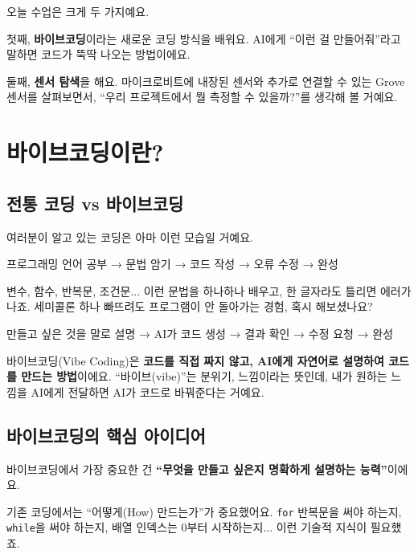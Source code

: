 \documentclass[11pt, a4paper]{article}
\begin{document}
오늘 수업은 크게 두 가지예요.

첫째, \textbf{바이브코딩}이라는 새로운 코딩 방식을 배워요. AI에게 ``이런 걸 만들어줘''라고 말하면 코드가 뚝딱 나오는 방법이에요.

둘째, \textbf{센서 탐색}을 해요. 마이크로비트에 내장된 센서와 추가로 연결할 수 있는 Grove 센서를 살펴보면서, ``우리 프로젝트에서 뭘 측정할 수 있을까?''를 생각해 볼 거예요.

\section{바이브코딩이란?}

\subsection{전통 코딩 vs 바이브코딩}

여러분이 알고 있는 코딩은 아마 이런 모습일 거예요.

\begin{corebox}[전통 코딩 방식]
프로그래밍 언어 공부 → 문법 암기 → 코드 작성 → 오류 수정 → 완성
\end{corebox}

변수, 함수, 반복문, 조건문... 이런 문법을 하나하나 배우고, 한 글자라도 틀리면 에러가 나죠. 세미콜론 하나 빠뜨려도 프로그램이 안 돌아가는 경험, 혹시 해보셨나요?

\begin{corebox}[바이브코딩 방식]
만들고 싶은 것을 말로 설명 → AI가 코드 생성 → 결과 확인 → 수정 요청 → 완성
\end{corebox}

바이브코딩(Vibe Coding)은 \textbf{코드를 직접 짜지 않고, AI에게 자연어로 설명하여 코드를 만드는 방법}이에요. ``바이브(vibe)''는 분위기, 느낌이라는 뜻인데, 내가 원하는 느낌을 AI에게 전달하면 AI가 코드로 바꿔준다는 거예요.

\subsection{바이브코딩의 핵심 아이디어}

바이브코딩에서 가장 중요한 건 \textbf{``무엇을 만들고 싶은지 명확하게 설명하는 능력''}이에요.

기존 코딩에서는 ``어떻게(How) 만드는가''가 중요했어요. \texttt{for} 반복문을 써야 하는지, \texttt{while}을 써야 하는지, 배열 인덱스는 0부터 시작하는지... 이런 기술적 지식이 필요했죠.
\end{document}
